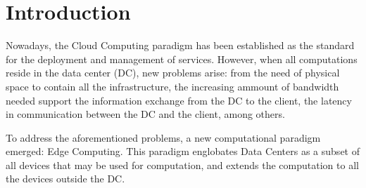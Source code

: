 \newcommand{\novathesis}{\emph{novathesis}}
\newcommand{\novathesisclass}{\texttt{novathesis.cls}}


\chapter{Introduction}
\label{cha:introduction}

Nowadays, the Cloud Computing paradigm has been established as the standard for the deployment and management of services. 
However, when all computations reside in the data center (DC), new problems arise:
from the need of physical space to contain all the infrastructure, the increasing ammount of bandwidth needed support the 
information exchange from the DC to the client, the latency in communication between the DC and the client, among others. 

To address the aforementioned problems, a new computational paradigm emerged: Edge Computing.
This paradigm englobates Data Centers as a subset of all devices that may be used for computation, 
and extends the computation to all the devices outside the DC.

 